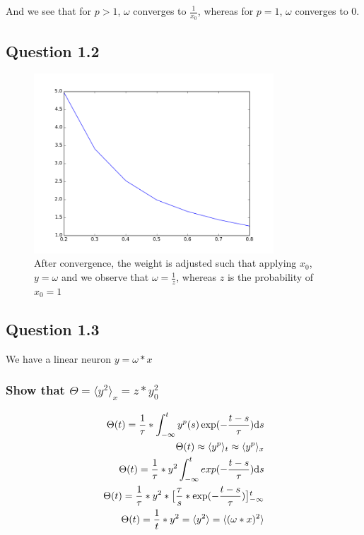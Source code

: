 And we see that for $p > 1$, $\omega$ converges to $\frac{1}{x_0}$, whereas for $p = 1$, $\omega$ converges to $0$.

\subsection{Question 1.2}

\begin{figure}[H]
 \centering
 \includegraphics[width = 0.8\textwidth]{../results/exercise12}
 \caption{After convergence, the weight is adjusted such that applying $x_0$, $y = \omega$ and we observe that $\omega = \frac{1}{z}$, whereas $z$ is the probability of $x_0 = 1$}
 \label{fig:bild1}
\end{figure}

\subsection{Question 1.3}

We have a linear neuron $y = \omega * x$

\subsubsection{Show that $\Theta = \langle y^2 \rangle_x = z * y_0^2$}

\begin{align*}
	\Theta(t) = \frac{1}{\tau} * \int_{-\infty}^{t} y^p (s)\exp(-\frac{t-s}{\tau}) \mathrm{d}s \\
	\Theta(t) \approx \langle y^p \rangle_t \approx \langle y^p \rangle_x \\
	\Theta(t) = \frac{1}{\tau} * y^2 \int_{-\infty}^t exp(-\frac{t-s}{\tau}) \mathrm{d}s \\
	\Theta(t) = \frac{1}{\tau} * y^2 * \big{[} \frac{\tau}{s} * \exp(-\frac{t-s}{\tau}) \big{]_{-\infty}^t} \\
	\Theta(t) = \frac{1}{t} * y^2 = \langle y^2 \rangle = \langle (\omega * x)^2 \rangle
\end{align*}

